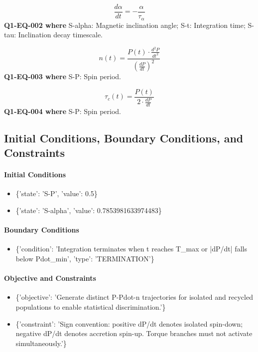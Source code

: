 \documentclass[11pt]{article}
\begin{document}
\begin{equation}\label{eq:Q1-EQ-002}
\frac{d\alpha}{dt} = -\frac{\alpha}{\tau_\alpha}
\end{equation}
\noindent\textbf{Q1-EQ-002 where} S-alpha: Magnetic inclination angle; S-t: Integration time; S-tau: Inclination decay timescale.

\begin{equation}\label{eq:Q1-EQ-003}
n(t) = \frac{P(t) \cdot \frac{d^2P}{dt^2}}{\left(\frac{dP}{dt}\right)^2}
\end{equation}
\noindent\textbf{Q1-EQ-003 where} S-P: Spin period.

\begin{equation}\label{eq:Q1-EQ-004}
\tau_c(t) = \frac{P(t)}{2 \cdot \frac{dP}{dt}}
\end{equation}
\noindent\textbf{Q1-EQ-004 where} S-P: Spin period.

\subsection{Initial Conditions, Boundary Conditions, and Constraints}

\paragraph{Initial Conditions}
\begin{itemize}
\item \{'state': 'S-P', 'value': 0.5\}
\item \{'state': 'S-alpha', 'value': 0.7853981633974483\}
\end{itemize}

\paragraph{Boundary Conditions}
\begin{itemize}
\item \{'condition': 'Integration terminates when t reaches T\_max or |dP/dt| falls below Pdot\_min', 'type': 'TERMINATION'\}
\end{itemize}

\paragraph{Objective and Constraints}
\begin{itemize}
\item \{'objective': 'Generate distinct P-Pdot-n trajectories for isolated and recycled populations to enable statistical discrimination.'\}
\item \{'constraint': 'Sign convention: positive dP/dt denotes isolated spin-down; negative dP/dt denotes accretion spin-up. Torque branches must not activate simultaneously.'\}
\end{itemize}
\end{document}

